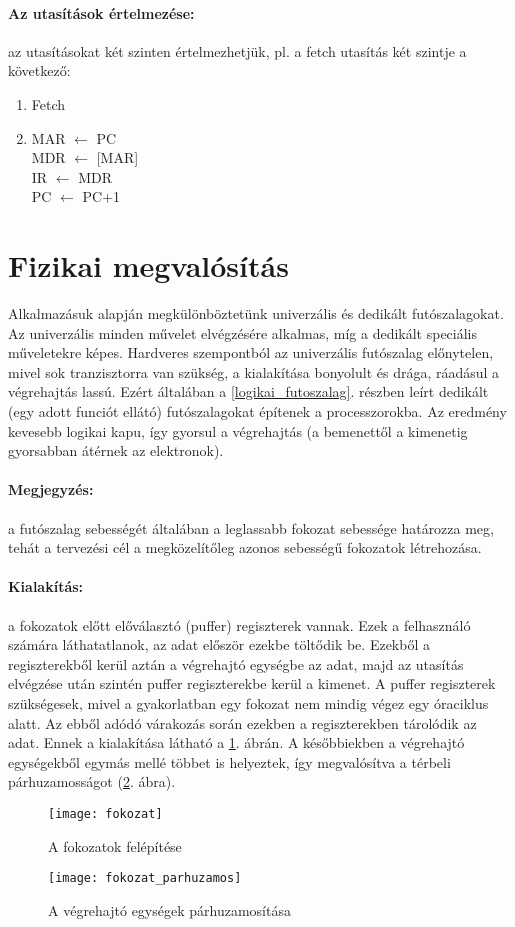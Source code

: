 \paragraph{Az utasítások értelmezése:} az utasításokat két szinten értelmezhetjük, pl. a fetch utasítás két szintje a következő:
\begin{enumerate}
    \item Fetch
    \item MAR $\leftarrow$ PC\\
    MDR $\leftarrow$ [MAR] \\
    IR $\leftarrow$ MDR \\
    PC $\leftarrow$ PC+1
\end{enumerate}

\section{Fizikai megvalósítás}
Alkalmazásuk alapján megkülönböztetünk univerzális és dedikált futószalagokat.
Az univerzális minden művelet elvégzésére alkalmas, míg a dedikált speciális műveletekre képes.
Hardveres szempontból az univerzális futószalag előnytelen, mivel sok tranzisztorra van szükség, a kialakítása bonyolult és drága, ráadásul a végrehajtás lassú.
Ezért általában a \ref{logikai_futoszalag}. részben leírt dedikált (egy adott funciót ellátó) futószalagokat építenek a processzorokba.
Az eredmény kevesebb logikai kapu, így gyorsul a végrehajtás (a bemenettől a kimenetig gyorsabban átérnek az elektronok).
\paragraph{Megjegyzés:} a futószalag sebességét általában a leglassabb fokozat sebessége határozza meg, tehát a tervezési cél a megközelítőleg azonos sebességű fokozatok létrehozása.
\paragraph{Kialakítás:} a fokozatok előtt előválasztó (puffer) regiszterek vannak. Ezek a felhasználó számára láthatatlanok, az adat először ezekbe töltődik be.
Ezekből a regiszterekből kerül aztán a végrehajtó egységbe az adat, majd az utasítás elvégzése után szintén puffer regiszterekbe kerül a kimenet.
A puffer regiszterek szükségesek, mivel a gyakorlatban egy fokozat nem mindig végez egy óraciklus alatt.
Az ebből adódó várakozás során ezekben a regiszterekben tárolódik az adat.
Ennek a kialakítása látható a \ref{fig:fokozat}. ábrán. A későbbiekben a végrehajtó egységekből egymás mellé többet is helyeztek, így megvalósítva a térbeli párhuzamosságot (\ref{fig:fokozat_parhuzamos}. ábra).
\begin{figure}[h]
    \texttt{[image: fokozat]}
    \centering
    \caption{A fokozatok felépítése}
    \label{fig:fokozat}
\end{figure}
\begin{figure}[h]
    \texttt{[image: fokozat\_parhuzamos]}
    \centering
    \caption{A végrehajtó egységek párhuzamosítása}
    \label{fig:fokozat_parhuzamos}
\end{figure}
